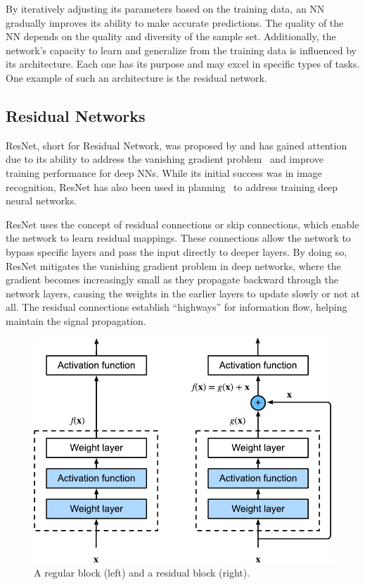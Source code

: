 By iteratively adjusting its parameters based on the training data, an NN gradually improves its ability to make accurate predictions. The quality of the NN depends on the quality and diversity of the sample set. Additionally, the network's capacity to learn and generalize from the training data is influenced by its architecture. Each one has its purpose and may excel in specific types of tasks. One example of such an architecture is the residual network.

\subsection{Residual Networks}
\label{sec:resnets}

ResNet, short for Residual Network, was proposed by \citet{He.etal/2016} and has gained attention due to its ability to address the vanishing gradient problem~\cite{Hochreiter/1998} and improve training performance for deep NNs. While its initial success was in image recognition, ResNet has also been used in planning~\cite{Agostinelli.etal/2019,Ferber.etal/2022} to address training deep neural networks.

ResNet uses the concept of residual connections or skip connections, which enable the network to learn residual mappings. These connections allow the network to bypass specific layers and pass the input directly to deeper layers. By doing so, ResNet mitigates the vanishing gradient problem in deep networks, where the gradient becomes increasingly small as they propagate backward through the network layers, causing the weights in the earlier layers to update slowly or not at all. The residual connections establish ``highways'' for information flow, helping maintain the signal propagation.

\begin{figure}[ht]
    \caption[A regular block and a residual block.]{A regular block (left) and a residual block (right).}
    \label{fig:residual-block}
    \addmargin
    \centering
    \includegraphics[width=0.75\linewidth]{figures/residual-block.pdf}
\end{figure}

